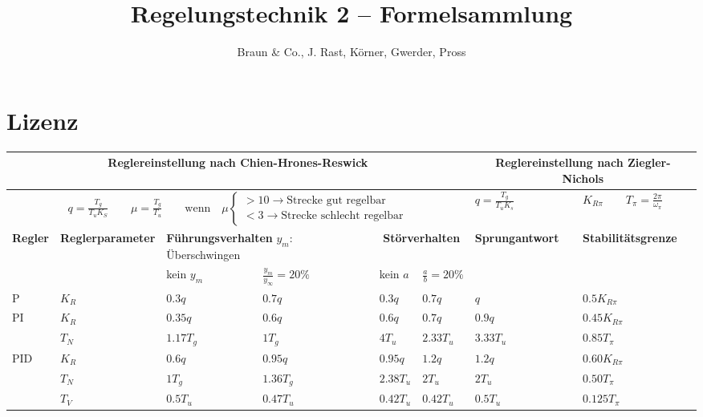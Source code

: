\documentclass[margin=small]{tex/hsrzf}
\title{Regelungstechnik 2 -- Formelsammlung}
\author{Braun \& Co., J. Rast, K\"orner, Gwerder, Pross}
\begin{document}
 

\maketitle
\tableofcontents

\section*{Lizenz}
\doclicenseThis{}

\newpage

\twocolumn


\onecolumn

\begin{table}
	\centering
	\renewcommand\arraystretch{1.2}
	\begin{tabular}{|l|p{1.8cm}|l|l|l|l||l|l|}
			\hline
			\multicolumn{6}{|c||}{
				\textbf{Reglereinstellung nach Chien-Hrones-Reswick}
			} &
			\multicolumn{2}{|c|}{
				\textbf{Reglereinstellung nach Ziegler-Nichols}
			}
		\\ \hline
		\multicolumn{6}{|c||}{
			$
			q = \frac{T_g}{T_uK_S} \qquad \mu = \frac{T_g}{T_u}
			\qquad \text{wenn} \quad \mu
			\begin{cases}
				> 10 \rightarrow \text{Strecke gut regelbar} \\
				< 3 \rightarrow \text{Strecke schlecht regelbar}
			\end{cases}
			$
		} & $q=\frac{T_g}{T_uK_s}$ & $K_{R\pi} \qquad T_\pi=\frac{2\pi}{\omega_\pi}$
		\\ \hline
		\textbf{Regler} & \textbf{Regler\-parameter} &
		\multicolumn{2}{|p{3.5cm}|}{\textbf{Führungsverhalten} \newline $y_m$:
		Überschwingen} &
		\multicolumn{2}{|c||}{\textbf{Störverhalten}} &
		\textbf{Sprungantwort} & \textbf{Stabilitätsgrenze}
		\\ \hline
		& & kein $y_m$ & $\frac{y_m}{y_\infty} = 20 \%$ & kein $a$ & $\frac{a}{b}= 20 \%$ & &
		\\ \hline
		P		& $K_R$		& $0.3q$	& $0.7q$	& $0.3q$	& $0.7q$	& $q$		& $0.5K_{R\pi}$
		\\ \hline
		PI	& $K_R$		& $0.35q$	& $0.6q$	& $0.6q$	& $0.7q$	& $0.9q$	& $0.45K_{R\pi}$
		\\
				& $T_N$		& $1.17T_g$	& $1T_g$	& $4T_u$	& $2.33T_u$ & $3.33T_u$ &
				$0.85T_{\pi}$ \\ \hline
		PID & $K_R$		& $0.6q$	& $0.95q$	& $0.95q$	& $1.2q$	& $1.2q$	& $0.60K_{R\pi}$
		\\
			& $T_N$		& $1T_g$	& $1.36T_g$	& $2.38T_u$	& $2T_u$	& $2T_u$	& $0.50T_\pi$
		\\
			& $T_V$		& $0.5T_u$	& $0.47T_u$	& $0.42T_u$	& $0.42T_u$ & $0.5T_u$	& $0.125T_\pi$
		\\ \hline
	\end{tabular}
\end{table}


\end{document}
